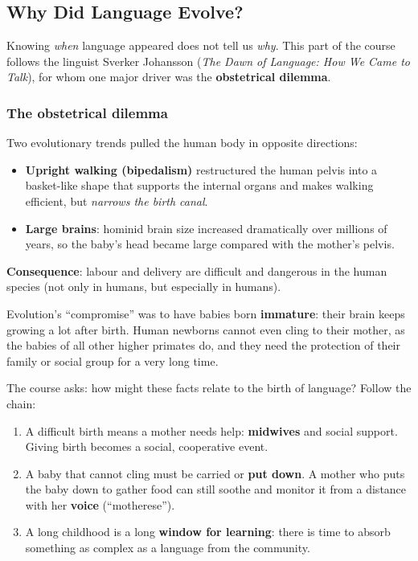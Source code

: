 \subsection{Why Did Language Evolve?}
\label{sec:drivers}

Knowing \emph{when} language appeared does not tell us \emph{why}. This part of the
course follows the linguist Sverker Johansson (\emph{The Dawn of Language: How We Came
to Talk}), for whom one major driver was the \textbf{obstetrical dilemma}.

\subsubsection{The obstetrical dilemma}

Two evolutionary trends pulled the human body in opposite directions:
\begin{itemize}[nosep]
  \item \textbf{Upright walking (bipedalism)} restructured the human pelvis into a
        basket-like shape that supports the internal organs and makes walking efficient,
        but \emph{narrows the birth canal}.
  \item \textbf{Large brains}: hominid brain size increased dramatically over millions
        of years, so the baby's head became large compared with the mother's pelvis.
\end{itemize}
\textbf{Consequence}: labour and delivery are difficult and dangerous in the human
species (not only in humans, but especially in humans).

Evolution's ``compromise'' was to have babies born \textbf{immature}: their brain keeps
growing a lot after birth. Human newborns cannot even cling to their mother, as the
babies of all other higher primates do, and they need the protection of their family
or social group for a very long time.

\begin{nbintuition}
The course asks: how might these facts relate to the birth of language? Follow the
chain:
\begin{enumerate}[nosep]
  \item A difficult birth means a mother needs help: \textbf{midwives} and social
        support. Giving birth becomes a social, cooperative event.
  \item A baby that cannot cling must be carried or \textbf{put down}. A mother who puts
        the baby down to gather food can still soothe and monitor it from a distance with
        her \textbf{voice} (``motherese'').
  \item A long childhood is a long \textbf{window for learning}: there is time to
        absorb something as complex as a language from the community.
\end{enumerate}
\end{nbintuition}

